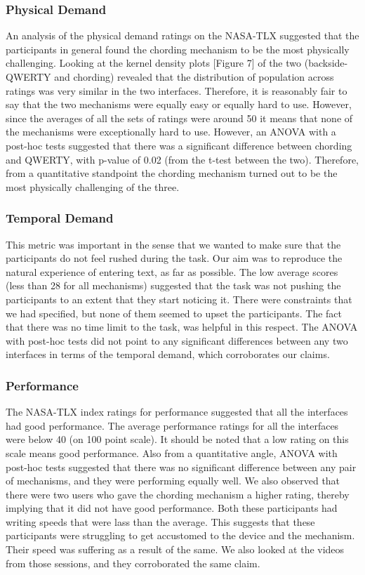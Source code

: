 \subsubsection{Physical Demand}

An analysis of the physical demand ratings on the NASA-TLX suggested
that the participants in general found the chording mechanism to be the most
physically challenging. Looking at the kernel
density plots [Figure 7] of the two (backside-QWERTY and chording) revealed that the distribution of population
across ratings was very similar in the two interfaces. Therefore, it is reasonably
fair to say that the two mechanisms were equally easy or equally hard
to use. However, since the averages of all the sets of ratings were
around 50 it means that none of the mechanisms were exceptionally hard to use. However, an ANOVA with a post-hoc tests suggested that there was a significant difference between chording and QWERTY, with p-value of 0.02 (from the t-test between the two). Therefore, from a quantitative standpoint the chording mechanism turned out to be the most physically challenging of the three.

\subsubsection{Temporal Demand}

This metric was important in the sense that we wanted to make sure
that the participants do not feel rushed during the task. Our aim was
to reproduce the natural experience of entering text, as far as
possible. The low average scores (less than 28 for all mechanisms)
suggested that the task was not pushing the participants to an extent
that they start noticing it. There were constraints that we had
specified, but none of them seemed to upset the participants. The fact
that there was no time limit to the task, was helpful in this respect. The ANOVA with post-hoc tests did not point to any significant differences between any two interfaces in terms of the temporal demand, which corroborates our claims.

\subsubsection{Performance}

The NASA-TLX index ratings for performance suggested that all the
interfaces had good performance. The average performance ratings for
all the interfaces were below 40 (on 100 point scale). It should be
noted that a low rating on this scale means good performance. Also from a quantitative angle, ANOVA with post-hoc tests suggested that there was no significant difference between any pair of mechanisms, and they were performing equally well. We also
observed that there were two users who gave the chording mechanism a
higher rating, thereby implying that it did not have good
performance. Both these participants had writing speeds that were lass
than the average. This suggests that these participants were
struggling to get accustomed to the device and the mechanism. Their
speed was suffering as a result of the same. We also looked at the
videos from those sessions, and they corroborated the same claim. 

